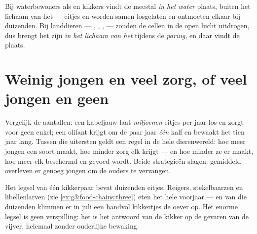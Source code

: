 \begin{proposition}\label{prop:g4:animal-reproduction:where}
Bij waterbewoners als  en kikkers vindt de  meestal
\emph{in het water} plaats, buiten het lichaam van het  ---
eitjes en  worden samen losgelaten en ontmoeten elkaar bij
duizenden. Bij landdieren --- , , , 
--- zouden de cellen in de open lucht uitdrogen, dus brengt het
 zijn  \emph{in het lichaam van het } tijdens de
\emph{paring}, en daar vindt de  plaats.
\end{proposition}
\admitted

\section{Weinig jongen en veel zorg, of veel jongen en geen}

\begin{proposition}\label{prop:g4:animal-reproduction:strategies}
Vergelijk de aantallen: een kabeljauw laat \emph{miljoenen} eitjes per
jaar los en zorgt voor geen enkel; een olifant krijgt om de paar jaar
\emph{één} kalf en bewaakt het tien jaar lang. Tussen die uitersten
geldt een regel in de hele dierenwereld: hoe meer jongen een soort
maakt, hoe minder zorg elk krijgt --- en hoe minder ze er maakt, hoe
meer elk beschermd en gevoed wordt. Beide strategieën slagen: gemiddeld
overleven er genoeg jongen om de ouders te vervangen.
\end{proposition}
\admitted

\begin{example}\label{ex:g4:animal-reproduction:pondcount}
Het legsel van één kikkerpaar bevat duizenden eitjes. Reigers,
stekelbaarzen en libellenlarven (zie \cref{ex:g3:food-chains:three})
eten het hele voorjaar  --- en van die duizenden klimmen er
in juli een handvol kikkertjes de oever op. Het enorme legsel is geen
verspilling: het is het antwoord van de kikker op de gevaren van de
vijver, helemaal zonder ouderlijke bewaking.
\end{example}

